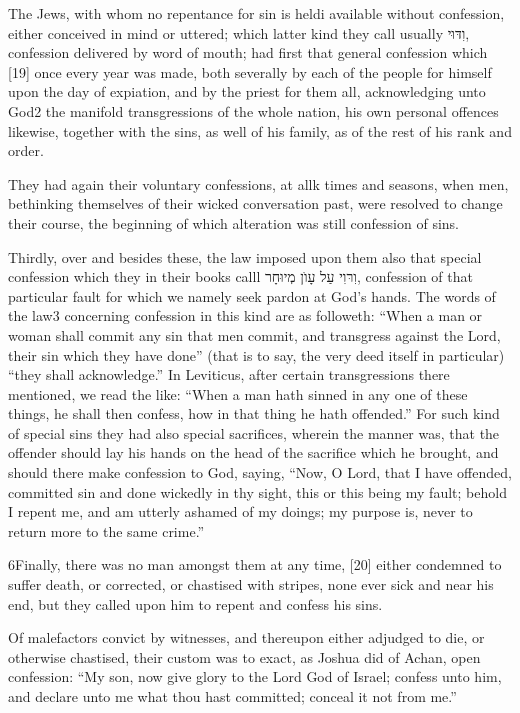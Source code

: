 The Jews, with whom no repentance for sin is heldi available without confession, either conceived in mind or uttered; which latter kind they call usually וִדּוּי, confession delivered by word of mouth; had first that general confession which [19] once every year was made, both severally by each of the people for himself upon the day of expiation, and by the priest for them all, acknowledging unto God2 the manifold transgressions of the whole nation, his own personal offences likewise, together with the sins, as well of his family, as of the rest of his rank and order.

They had again their voluntary confessions, at allk times and seasons, when men, bethinking themselves of their wicked conversation past, were resolved to change their course, the beginning of which alteration was still confession of sins.

Thirdly, over and besides these, the law imposed upon them also that special confession which they in their books calll וִרּוִי עַל עָוׁן מְיוּחָר, confession of that particular fault for which we namely seek pardon at God’s hands. The words of the law3 concerning confession in this kind are as followeth: “When a man or woman shall commit any sin that men commit, and transgress against the Lord, their sin which they have done” (that is to say, the very deed itself in particular) “they shall acknowledge.” In Leviticus, after certain transgressions there mentioned, we read the like: “When a man hath sinned in any one of these things, he shall then confess, how in that thing he hath offended.” For such kind of special sins they had also special sacrifices, wherein the manner was, that the offender should lay his hands on the head of the sacrifice which he brought, and should there make confession to God, saying, “Now, O Lord, that I have offended, committed sin and done wickedly in thy sight, this or this being my fault; behold I repent me, and am utterly ashamed of my doings; my purpose is, never to return more to the same crime.”

6Finally, there was no man amongst them at any time, [20] either condemned to suffer death, or corrected, or chastised with stripes, none ever sick and near his end, but they called upon him to repent and confess his sins.

Of malefactors convict by witnesses, and thereupon either adjudged to die, or otherwise chastised, their custom was to exact, as Joshua did of Achan, open confession: “My son, now give glory to the Lord God of Israel; confess unto him, and declare unto me what thou hast committed; conceal it not from me.”

